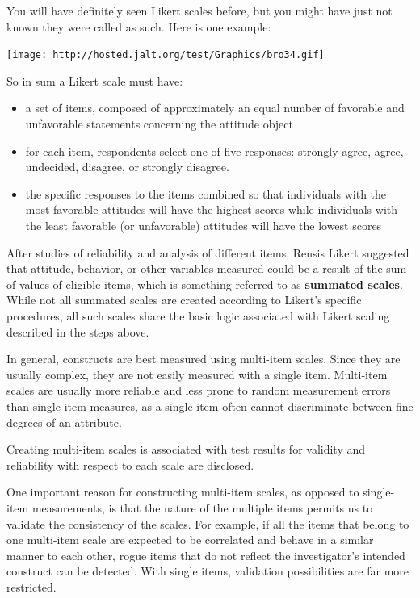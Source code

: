 \documentclass[]{book}
\providecommand{\tightlist}{%
  \setlength{\itemsep}{0pt}\setlength{\parskip}{0pt}}
\theoremstyle{definition}
\theoremstyle{definition}
\theoremstyle{definition}
\theoremstyle{remark}
\begin{document}
You will have definitely seen Likert scales before, but you might have
just not known they were called as such. Here is one example:

\texttt{[image: http://hosted.jalt.org/test/Graphics/bro34.gif]}

So in sum a Likert scale must have:

\begin{itemize}
\tightlist
\item
  a set of items, composed of approximately an equal number of favorable
  and unfavorable statements concerning the attitude object
\item
  for each item, respondents select one of five responses: strongly
  agree, agree, undecided, disagree, or strongly disagree.\\
\item
  the specific responses to the items combined so that individuals with
  the most favorable attitudes will have the highest scores while
  individuals with the least favorable (or unfavorable) attitudes will
  have the lowest scores
\end{itemize}

After studies of reliability and analysis of different items, Rensis
Likert suggested that attitude, behavior, or other variables measured
could be a result of the sum of values of eligible items, which is
something referred to as \textbf{summated scales}. While not all
summated scales are created according to Likert's specific procedures,
all such scales share the basic logic associated with Likert scaling
described in the steps above.

In general, constructs are best measured using multi-item scales. Since
they are usually complex, they are not easily measured with a single
item. Multi-item scales are usually more reliable and less prone to
random measurement errors than single-item measures, as a single item
often cannot discriminate between fine degrees of an attribute.

Creating multi-item scales is associated with test results for validity
and reliability with respect to each scale are disclosed.

One important reason for constructing multi-item scales, as opposed to
single-item measurements, is that the nature of the multiple items
permits us to validate the consistency of the scales. For example, if
all the items that belong to one multi-item scale are expected to be
correlated and behave in a similar manner to each other, rogue items
that do not reflect the investigator's intended construct can be
detected. With single items, validation possibilities are far more
restricted.
\end{document}
